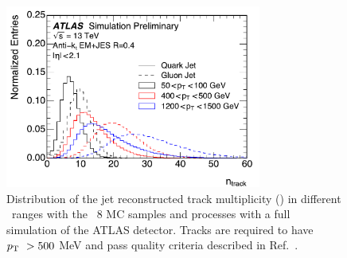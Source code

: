 \begin{figure}[htb]
 \centering
\includegraphics[width=0.75\textwidth]{fig/tagging/fig_01_ATL-PHYS-PUB-2017-009.pdf}
\caption{Distribution of the jet reconstructed track multiplicity (\ntrk ) in
 different \pt\ ranges with the \pythia~8 MC samples and processes with a full simulation of the
 ATLAS detector. Tracks are required to have $p_{\mathrm{T}}~> 500$ MeV and pass
  quality criteria described in Ref.~\cite{ATL-PHYS-PUB-2017-009}. }
\label{fig:jet_pt_quark_gluon}
\end{figure}

